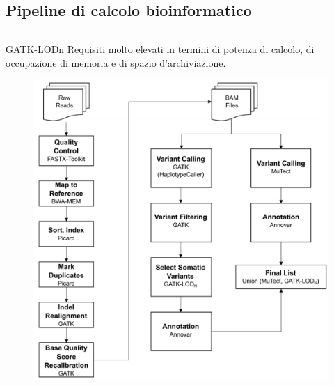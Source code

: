 \documentclass{beamer}
\begin{document}
\subsection{Pipeline di calcolo bioinformatico}
\begin{frame}
\begin{columns}
\begin{column}{0.8\linewidth}
\begin{block}{GATK-LODn}
Requisiti molto elevati in termini di potenza di calcolo, di occupazione di memoria e di spazio d’archiviazione.
\begin{figure}
\centering
\includegraphics[scale=0.3]{GATK-LODn.png}
\end{figure}
\end{block}
\end{column}
\end{columns}
\end{frame}
\end{document}
